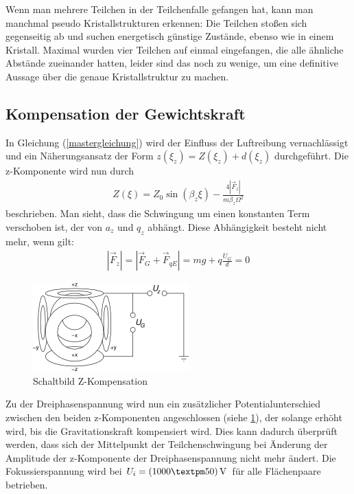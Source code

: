 \documentclass[a4paper,12pt]{article}
\begin{document}
Wenn man mehrere Teilchen in der Teilchenfalle gefangen hat, kann man manchmal pseudo Kristallstrukturen erkennen:
Die Teilchen stoßen sich gegenseitig ab und suchen energetisch günstige Zustände, ebenso wie in einem Kristall.
Maximal wurden vier Teilchen auf einmal eingefangen, die alle ähnliche Abstände zueinander hatten, leider sind das noch zu wenige, um eine definitive Aussage über die genaue Kristallstruktur zu machen.

\subsection{Kompensation der Gewichtskraft}
In Gleichung (\ref{mastergleichung}) wird der Einfluss der Luftreibung vernachlässigt und ein Näherungsansatz der Form $z(ξ_z) = Z(ξ_z)+d(ξ_z)$ durchgeführt.
Die z-Komponente wird nun durch
\begin{align*}
	Z(ξ) = Z_0\sin(β_zξ) - \frac{4|\vec{F}_z|}{mβ_zΩ^2}
\end{align*}
beschrieben.
Man sieht, dass die Schwingung um einen konstanten Term verschoben ist, der von $a_z$ und $q_z$ abhängt.
Diese Abhängigkeit besteht nicht mehr, wenn gilt:
\begin{align}
	\label{kraftgleichgew}
	|\vec{F}_{z}| = |\vec{F}_G + \vec{F}_{qE}| = mg + q\frac{U_G}{d} = 0
\end{align}

\begin{figure}[htb]
		\centering
		\includegraphics{Schaltbild_Z_Kompensation.png}
		\caption{Schaltbild Z-Kompensation}
		\label{schalt-z}
\end{figure}

Zu der Dreiphasenspannung wird nun ein zusätzlicher Potentialunterschied zwischen den beiden z-Komponenten angeschlossen (siehe \ref{schalt-z}), der solange erhöht wird, bis die Gravitationskraft kompensiert wird.
Dies kann dadurch überprüft werden, dass sich der Mittelpunkt der Teilchenschwingung bei Änderung der Amplitude der z-Komponente der Dreiphasenspannung nicht mehr ändert.
Die Fokussierspannung wird bei $U_i = \unit[(1000±50)]{V}$ für alle Flächenpaare betrieben.
\end{document}
